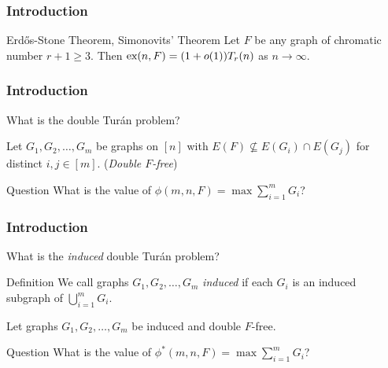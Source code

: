 \documentclass{beamer}
\newcommand*{\ex}{\textnormal{ex}}
\begin{document}
\begin{frame}
  \frametitle{Introduction}

  \begin{block}{Erd\H{o}s-Stone Theorem, Simonovits' Theorem}
    Let $F$ be any graph of chromatic number $r + 1 \geq 3$. Then $\ex(n, F) = (1 + o(1))T_r(n)$ as $n \rightarrow \infty$.
  \end{block}
\end{frame}

\begin{frame}
\frametitle{Introduction}

What is the double Turán problem? \pause

\vspace{0.5cm}

Let $G_1, G_2, \ldots, G_m$ be graphs on $[n]$ with $E(F) \not\subseteq E(G_i) \cap E(G_j)$ for distinct $i, j \in [m]$. \pause (\textit{Double $F$-free})

\pause

\begin{block}{Question}
  What is the value of $\phi(m, n, F) = \max \sum_{i = 1}^m G_i$?
\end{block}
\end{frame}

\begin{frame}
  \frametitle{Introduction}

  What is the \textit{induced} double Turán problem? \pause

  \begin{block}{Definition}
    We call graphs $G_1, G_2, \ldots, G_m$ \textit{induced} if each $G_i$ is an induced subgraph of $\bigcup_{i = 1}^m G_i$.
  \end{block}

  \pause

  \vspace{0.5cm}

  Let graphs $G_1, G_2, \ldots, G_m$ be induced and double $F$-free.

  \begin{block}{Question}
    What is the value of $\phi^*(m, n, F) = \max \sum_{i = 1}^m G_i$?
  \end{block}
\end{frame}
\end{document}
